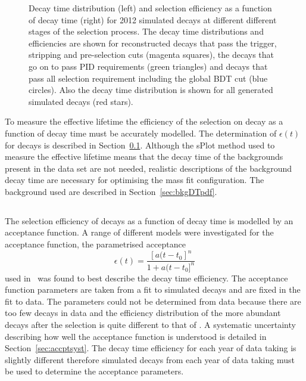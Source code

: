 \begin{figure}[htbp]
\begin{subfigure}[b]{0.48\textwidth}
   \end{subfigure}
    \caption{Decay time distribution (left) and selection efficiency as a function of decay time (right) for 2012 \bsmumu simulated decays at different different stages of the selection process. The decay time distributions and efficiencies are shown for reconstructed decays that pass the trigger, stripping and pre-selection cuts (magenta squares), the decays that go on to pass PID requirements (green triangles) and decays that pass all selection requirement including the global BDT cut (blue circles). Also the decay time distribution is shown for all generated simulated decays (red stars).} %
    \label{fig:accpteg}
\end{figure}

To measure the \bsmumu effective lifetime the efficiency of the selection on \bsmumu decay as a function of decay time must be accurately modelled. The determination of $\epsilon(t)$ for \bsmumu decays is described in Section~\ref{sec:signalDTpdf}. Although the sPlot method used to measure the \bsmumu effective lifetime means that the decay time \pdfs of the backgrounds present in the data set are not needed, realistic  descriptions of the background decay time \pdfs are necessary for optimising the mass fit configuration. The background \pdfs used are described in Section~\ref{sec:bkgDTpdf}.


\subsection{\bsmumu}%
\label{sec:signalDTpdf}
The selection efficiency of \bsmumu decays as a function of decay time is modelled by an acceptance function. A range of different models were investigated for the acceptance function, the parametrised acceptance 
\begin{equation}
\epsilon(t) = \frac{[a(t - t_{0}]^{n}}{1 + a(t - t_{0}]^{n}}
\label{eq:accpt}
\end{equation}
used in~\cite{LHCb:2011ab} was found to best describe the \bsmumu decay time efficiency. The acceptance function parameters are taken from a fit to simulated \bsmumu decays and are fixed in the fit to data. The parameters could not be determined from data because there are too few \bsmumu decays in data and the efficiency distribution of the more abundant \bhh decays after the selection is quite different to that of \bsmumu. A systematic uncertainty describing how well the acceptance function is understood is detailed in Section~\ref{sec:accptsyst}. The decay time efficiency for each year of data taking is slightly different therefore simulated decays from each year of data taking must be used to determine the acceptance parameters.


